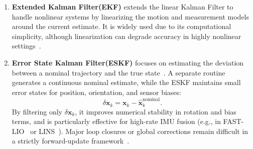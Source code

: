 \begin{enumerate}
    \item \textbf{Extended Kalman Filter(EKF) }extends the linear Kalman Filter \cite{kalman1960new} to handle nonlinear systems by linearizing the motion and measurement models around the current estimate. It is widely used due to its computational simplicity, although linearization can degrade accuracy in highly nonlinear settings~\cite{thrun2005probabilistic}.
    
    
        
      
    \item \textbf{Error State Kalman Filter(ESKF)} focuses on estimating the deviation between a nominal trajectory and the true state~\cite{mourikis2007multi}. A separate routine generates a continuous nominal estimate, while the ESKF maintains small error states for position, orientation, and sensor biases:
\begin{equation}
\delta \mathbf{x}_k = \mathbf{x}_k - \hat{\mathbf{x}}_{k}^{\text{nominal}}.
\end{equation}
By filtering only $\delta \mathbf{x}_k$, it improves numerical stability in rotation and bias terms, and is particularly effective for high-rate IMU fusion (e.g., in FAST-LIO~\cite{xuFastLIO2021} or LINS~\cite{lins}). Major loop closures or global corrections remain difficult in a strictly forward-update framework~\cite{cadena2016past}.


\end{enumerate}
